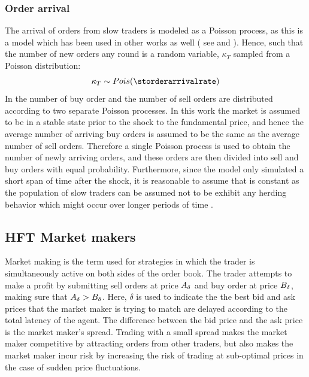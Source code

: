 \subsubsection{Order arrival}
The arrival of orders from slow traders is modeled as a Poisson process, as this is a model which has been used in other works as well ( see \cite{cincotti2006waiting} and \cite{amihud1980dealership}). Hence, such that the number of new orders any round  is a random variable, $\kappa_T$ sampled from a Poisson distribution:
\begin{equation}\label{eq:poisson_distribution}
\kappa_T \sim Pois(\storderarrivalrate)
\end{equation}
In \cite{amihud1980dealership} the number of buy order and the number of sell orders are distributed according to two separate Poisson processes. In this work the market is assumed to be in a stable state prior to the shock to the fundamental price, and hence the average number of arriving buy orders is assumed to be the same as the average number of sell orders. Therefore a single Poisson process is used to obtain the number of newly arriving orders, and these orders are then divided into sell and buy orders with equal probability. Furthermore, since the model only simulated a short span of time after the shock, it is reasonable to assume that \avrstorders{} is constant as the population of slow traders can be assumed not to be exhibit any herding behavior which might occur over longer periods of time \cite{herding}.


\subsection{HFT Market makers}\label{section:market_maker}
Market making is the term used for strategies in which the trader is simultaneously active on both sides of the order book. The trader attempts to make a profit by submitting sell orders at price $A_{\delta}$ and buy order at price $B_{\delta}$, making sure that $A_{\delta} > B_{\delta}$. Here, $\delta$ is used to indicate the the best bid and ask prices that the market maker is trying to match are delayed according to the total latency of the agent. The difference between the bid price and the ask price is the market maker's spread. Trading with a small spread makes the market maker competitive by attracting orders from other traders, but also makes the market maker incur risk by increasing the risk of trading at sub-optimal prices in the case of sudden price fluctuations. 

